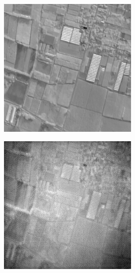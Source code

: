 \begin{figure}[H]
    \centering
    \begin{subfigure}[b]{0.24\textwidth}
        \centering
        \includegraphics[width=\textwidth]{../figs/outputs/pan/24.png}
    \end{subfigure}
    \hfill
    \begin{subfigure}[b]{0.24\textwidth}
        \centering
        \includegraphics[width=\textwidth]{../figs/outputs/cut/24.png}

\end{subfigure}
\end{figure}
